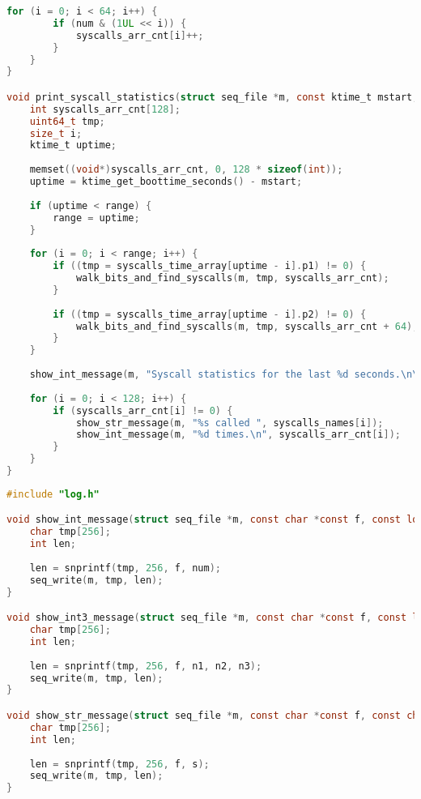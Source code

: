 \begin{lstlisting}[label=lst:stat, caption=Листинг файла stat.c, language=c]
	for (i = 0; i < 64; i++) {
		if (num & (1UL << i)) {
			syscalls_arr_cnt[i]++;
		}
	}
}

void print_syscall_statistics(struct seq_file *m, const ktime_t mstart, ktime_t range) {
	int syscalls_arr_cnt[128];
	uint64_t tmp;
	size_t i;
	ktime_t uptime;
	
	memset((void*)syscalls_arr_cnt, 0, 128 * sizeof(int));
	uptime = ktime_get_boottime_seconds() - mstart;
	
	if (uptime < range) {
		range = uptime;
	}
	
	for (i = 0; i < range; i++) {
		if ((tmp = syscalls_time_array[uptime - i].p1) != 0) {
			walk_bits_and_find_syscalls(m, tmp, syscalls_arr_cnt);
		}
		
		if ((tmp = syscalls_time_array[uptime - i].p2) != 0) {
			walk_bits_and_find_syscalls(m, tmp, syscalls_arr_cnt + 64);
		}
	}
	
	show_int_message(m, "Syscall statistics for the last %d seconds.\n\n", range);
	
	for (i = 0; i < 128; i++) {
		if (syscalls_arr_cnt[i] != 0) {
			show_str_message(m, "%s called ", syscalls_names[i]);
			show_int_message(m, "%d times.\n", syscalls_arr_cnt[i]);
		}
	}
}
\end{lstlisting}

\begin{lstlisting}[label=lst:log, caption=Листинг файла log.c, language=c]
#include "log.h"

void show_int_message(struct seq_file *m, const char *const f, const long num) {
	char tmp[256];
	int len;
	
	len = snprintf(tmp, 256, f, num);
	seq_write(m, tmp, len);
}

void show_int3_message(struct seq_file *m, const char *const f, const long n1, const long n2, const long n3) {
	char tmp[256];
	int len;
	
	len = snprintf(tmp, 256, f, n1, n2, n3);
	seq_write(m, tmp, len);
}

void show_str_message(struct seq_file *m, const char *const f, const char *const s) {
	char tmp[256];
	int len;
	
	len = snprintf(tmp, 256, f, s);
	seq_write(m, tmp, len);
}
\end{lstlisting}

